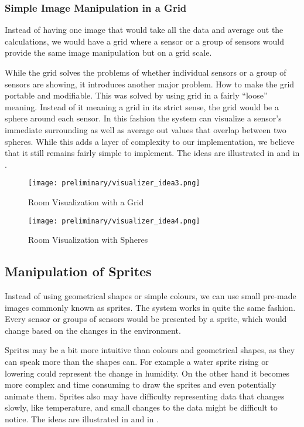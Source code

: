 \documentclass[../document]{subfiles}
\begin{document}
\subsubsection{Simple Image Manipulation in a Grid}
Instead of having one image that would take all the data and average out the calculations, we would have a grid where a sensor or a group of sensors would provide the same image manipulation but on a grid scale.

While the grid solves the problems of whether individual sensors or a group of sensors are showing, it introduces another major problem. How to make the grid portable and modifiable. This was solved by using grid in a fairly “loose” meaning. Instead of it meaning a grid in its strict sense, the grid would be a sphere around each sensor. In this fashion the system can visualize a sensor’s immediate surrounding as well as average out values that overlap between two spheres. While this adds a layer of complexity to our implementation, we believe that it still remains fairly simple to implement. The ideas are illustrated in   and in .

\begin{figure}[H]
	\texttt{[image: preliminary/visualizer\_idea3.png]}
	\caption{Room Visualization with a Grid}
	\label{fig:visualizer_idea3}
\end{figure}

\begin{figure}[H]
	\texttt{[image: preliminary/visualizer\_idea4.png]}
	\caption{Room Visualization with Spheres}
	\label{fig:visualizer_idea4}
\end{figure}

\subsection{Manipulation of Sprites}

Instead of using geometrical shapes or simple colours, we can use small pre-made images commonly known as sprites. The system works in quite the same fashion. Every sensor or groups of sensors would be presented by a sprite, which would change based on the changes in the environment.

Sprites may be a bit more intuitive than colours and geometrical shapes, as they can speak more than the shapes can. For example a water sprite rising or lowering could represent the change in humidity. On the other hand it becomes more complex and time consuming to draw the sprites and even potentially animate them. Sprites also may have difficulty representing data that changes slowly, like temperature, and small changes to the data might be difficult to notice. The ideas are illustrated in   and in .
\end{document}
